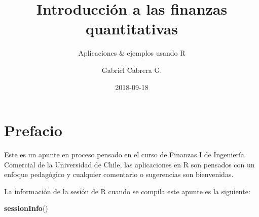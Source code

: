\documentclass[12pt,]{book}
\title{Introducción a las finanzas quantitativas}
\subtitle{Aplicaciones \& ejemplos usando R}
\author{Gabriel Cabrera G.}
\date{2018-09-18}
\newenvironment{Shaded}{\begin{snugshade}}{\end{snugshade}}
\newcommand{\KeywordTok}[1]{\textcolor[rgb]{0.13,0.29,0.53}{\textbf{#1}}}
\newcommand{\NormalTok}[1]{#1}
\begin{document}
\maketitle

{
\hypersetup{linkcolor=black}
\setcounter{tocdepth}{2}
\tableofcontents
}
\listoftables
\listoffigures
\chapter*{Prefacio}\label{prefacio}


Este es un apunte en proceso pensado en el curso de Finanzas I de
Ingeniería Comercial de la Universidad de Chile, las aplicaciones en R
son pensados con un enfoque pedagógico y cualquier comentario o
sugerencias son bienvenidas.

La información de la sesión de R cuando se compila este apunte es la
siguiente:

\begin{Shaded}
\begin{Highlighting}[]
\KeywordTok{sessionInfo}\NormalTok{()}
\end{Highlighting}
\end{Shaded}
\end{document}
